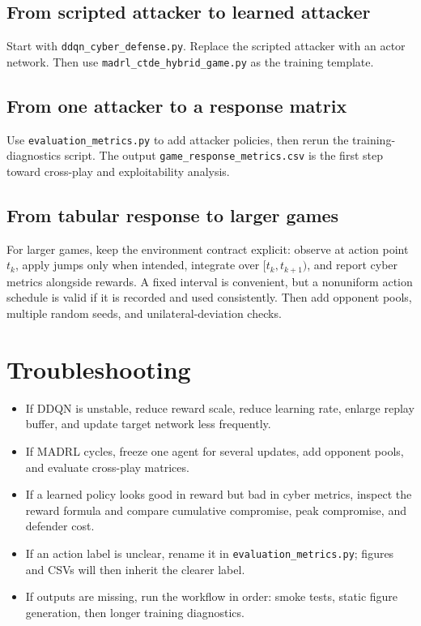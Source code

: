 \documentclass[11pt,a4paper]{article}
\begin{document}
\subsection{From scripted attacker to learned attacker}
Start with \texttt{ddqn\_cyber\_defense.py}. Replace the scripted attacker with an actor network. Then use \texttt{madrl\_ctde\_hybrid\_game.py} as the training template.

\subsection{From one attacker to a response matrix}
Use \texttt{evaluation\_metrics.py} to add attacker policies, then rerun the training-diagnostics script.  The output \texttt{game\_response\_metrics.csv} is the first step toward cross-play and exploitability analysis.

\subsection{From tabular response to larger games}
For larger games, keep the environment contract explicit: observe at action point $t_k$, apply jumps only when intended, integrate over $[t_k,t_{k+1})$, and report cyber metrics alongside rewards. A fixed interval is convenient, but a nonuniform action schedule is valid if it is recorded and used consistently. Then add opponent pools, multiple random seeds, and unilateral-deviation checks.

\section{Troubleshooting}
\begin{itemize}
\item If DDQN is unstable, reduce reward scale, reduce learning rate, enlarge replay buffer, and update target network less frequently.
\item If MADRL cycles, freeze one agent for several updates, add opponent pools, and evaluate cross-play matrices.
\item If a learned policy looks good in reward but bad in cyber metrics, inspect the reward formula and compare cumulative compromise, peak compromise, and defender cost.
\item If an action label is unclear, rename it in \texttt{evaluation\_metrics.py}; figures and CSVs will then inherit the clearer label.
\item If outputs are missing, run the workflow in order: smoke tests, static figure generation, then longer training diagnostics.
\end{itemize}
\end{document}
